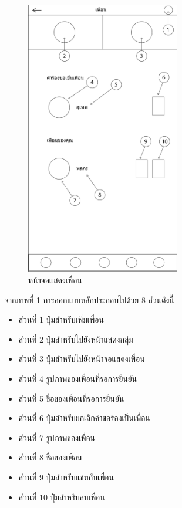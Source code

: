 		\begin{figure}[H]
			\centering
			\includegraphics[width=0.6\textwidth]{Figures/3/UI/friend}
			\caption{หน้าจอแสดงเพื่อน}
			\label{Fig:เพื่อน}
		\end{figure}
		จากภาพที่ \ref{Fig:เพื่อน} การออกแบบหลักประกอบไปด้วย 8 ส่วนดังนี้
		\begin{itemize}
			\item ส่วนที่ 1 ปุ่มสำหรับเพิ่มเพื่อน
			\item ส่วนที่ 2 ปุ่มสำหรับไปยังหน้าแสดงกลุ่ม
			\item ส่วนที่ 3 ปุ่มสำหรับไปยังหน้าจอแสดงเพื่อน
			\item ส่วนที่ 4 รูปภาพของเพื่อนที่รอการยืนยัน
			\item ส่วนที่ 5 ชื่อของเพื่อนที่รอการยืนยัน
			\item ส่วนที่ 6 ปุ่มสำหรับยกเลิกคำขอร้องเป็นเพื่อน
			\item ส่วนที่ 7 รูปภาพของเพื่อน
			\item ส่วนที่ 8 ชื่อของเพื่อน
			\item ส่วนที่ 9 ปุ่มสำหรับแชทกับเพื่อน
			\item ส่วนที่ 10 ปุ่มสำหรับลบเพื่อน
		\end{itemize} \\

